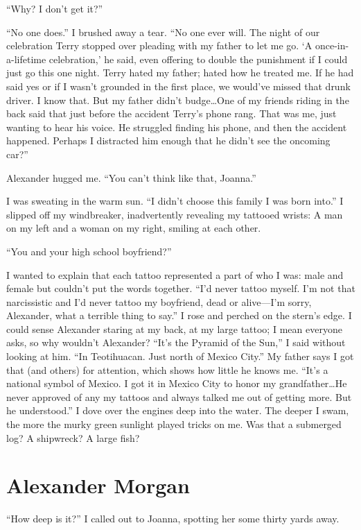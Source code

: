 ``Why? I don't get it?''

``No one does.'' I brushed away a tear. ``No one ever will. The night of
our celebration Terry stopped over pleading with my father to let me go.
`A once-in-a-lifetime celebration,' he said, even offering to double the
punishment if I could just go this one night. Terry hated my father;
hated how he treated me. If he had said yes or if I wasn't grounded in
the first place, we would've missed that drunk driver. I know that. But
my father didn't budge\ldots One of my friends riding in the back said
that just before the accident Terry's phone rang. That was me, just
wanting to hear his voice. He struggled finding his phone, and then the
accident happened. Perhaps I distracted him enough that he didn't see
the oncoming car?''

Alexander hugged me. ``You can't think like that, Joanna.''

I was sweating in the warm sun. ``I didn't choose this family I was born
into.'' I slipped off my windbreaker, inadvertently revealing my
tattooed wrists: A man on my left and a woman on my right, smiling at
each other.

``You and your high school boyfriend?''

I wanted to explain that each tattoo represented a part of who I was:
male and female but couldn't put the words together. ``I'd never tattoo
myself. I'm not that narcissistic and I'd never tattoo my boyfriend,
dead or alive---I'm sorry, Alexander, what a terrible thing to say.'' I
rose and perched on the stern's edge. I could sense Alexander staring at
my back, at my large tattoo; I mean everyone asks, so why wouldn't
Alexander? ``It's the Pyramid of the Sun,'' I said without looking at
him. ``In Teotihuacan. Just north of Mexico City.'' My father says I got
that (and others) for attention, which shows how little he knows me.
``It's a national symbol of Mexico. I got it in Mexico City to honor my
grandfather\ldots He never approved of any my tattoos and always talked
me out of getting more. But he understood.'' I dove over the engines
deep into the water. The deeper I swam, the more the murky green
sunlight played tricks on me. Was that a submerged log? A shipwreck? A
large fish?

\chapter{Alexander Morgan}

\titlemark

``How deep is it?'' I called out to Joanna, spotting her some thirty
yards away.

